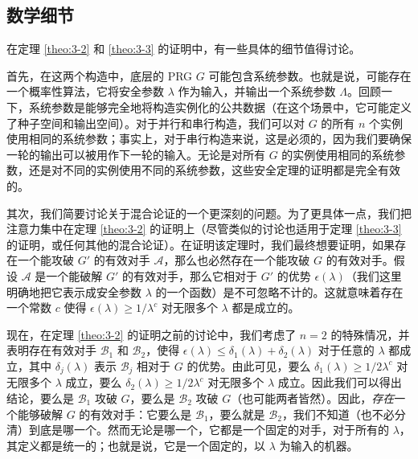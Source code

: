 \subsection{数学细节}\label{subsec:3-4-3}

在定理 \ref{theo:3-2} 和 \ref{theo:3-3} 的证明中，有一些具体的细节值得讨论。

首先，在这两个构造中，底层的 PRG $G$ 可能包含系统参数。也就是说，可能存在一个概率性算法，它将安全参数 $\lambda$ 作为输入，并输出一个系统参数 $\Lambda$。回顾一下，系统参数是能够完全地将构造实例化的公共数据（在这个场景中，它可能定义了种子空间和输出空间）。对于并行和串行构造，我们可以对 $G$ 的所有 $n$ 个实例使用相同的系统参数；事实上，对于串行构造来说，这是必须的，因为我们要确保一轮的输出可以被用作下一轮的输入。无论是对所有 $G$ 的实例使用相同的系统参数，还是对不同的实例使用不同的系统参数，这些安全定理的证明都是完全有效的。

其次，我们简要讨论关于混合论证的一个更深刻的问题。为了更具体一点，我们把注意力集中在定理 \ref{theo:3-2} 的证明上（尽管类似的讨论也适用于定理 \ref{theo:3-3} 的证明，或任何其他的混合论证）。在证明该定理时，我们最终想要证明，如果存在一个能攻破 $G'$ 的有效对手 $\mathcal A$，那么也必然存在一个能攻破 $G$ 的有效对手。假设 $\mathcal A$ 是一个能破解 $G'$ 的有效对手，那么它相对于 $G'$ 的优势 $\epsilon(\lambda)$（我们这里明确地把它表示成安全参数 $\lambda$ 的一个函数）是不可忽略不计的。这就意味着存在一个常数 $c$ 使得 $\epsilon(\lambda)\geq{1}/{\lambda^c}$ 对无限多个 $\lambda$ 都是成立的。

现在，在定理 \ref{theo:3-2} 的证明之前的讨论中，我们考虑了 $n=2$ 的特殊情况，并表明存在有效对手 $\mathcal{B}_1$ 和 $\mathcal{B}_2$，使得 $\epsilon(\lambda)\leq\delta_1(\lambda)+\delta_2(\lambda)$ 对于任意的 $\lambda$ 都成立，其中 $\delta_j(\lambda)$ 表示 $\mathcal{B}_j$ 相对于 $G$ 的优势。由此可见，要么 $\delta_1(\lambda)\geq{1}/{2\lambda^c}$ 对无限多个 $\lambda$ 成立，要么 $\delta_2(\lambda)\geq{1}/{2\lambda^c}$ 对无限多个 $\lambda$ 成立。因此我们可以得出结论，要么是 $\mathcal{B}_1$ 攻破 $G$，要么是 $\mathcal{B}_2$ 攻破 $G$（也可能两者皆然）。因此，\emph{存在}一个能够破解 $G$ 的有效对手：它要么是 $\mathcal{B}_1$，要么就是 $\mathcal{B}_2$，我们不知道（也不必分清）到底是哪一个。然而无论是哪一个，它都是一个固定的对手，对于所有的 $\lambda$，其定义都是统一的；也就是说，它是一个固定的，以 $\lambda$ 为输入的机器。

